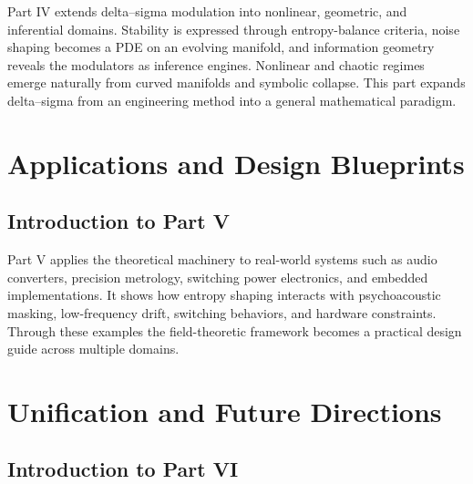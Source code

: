 \documentclass[12pt,oneside]{book}
\theoremstyle{definition}
\theoremstyle{plain}
\begin{document}
Part IV extends delta--sigma modulation into nonlinear, geometric, and inferential domains. Stability is expressed through entropy-balance criteria, noise shaping becomes a PDE on an evolving manifold, and information geometry reveals the modulators as inference engines. Nonlinear and chaotic regimes emerge naturally from curved manifolds and symbolic collapse. This part expands delta--sigma from an engineering method into a general mathematical paradigm.








\part{Applications and Design Blueprints}

\chapter*{Introduction to Part V}

Part V applies the theoretical machinery to real-world systems such as audio converters, precision metrology, switching power electronics, and embedded implementations. It shows how entropy shaping interacts with psychoacoustic masking, low-frequency drift, switching behaviors, and hardware constraints. Through these examples the field-theoretic framework becomes a practical design guide across multiple domains.







\part{Unification and Future Directions}

\chapter*{Introduction to Part VI}
\end{document}
